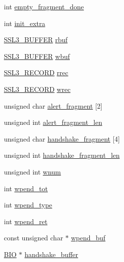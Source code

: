 \begin{DoxyCompactItemize}
\item 
int \hyperlink{structssl3__state__st_a97e5546af9e51f39f4a6c9f7b73ba1b1}{empty\+\_\+fragment\+\_\+done}
\item 
int \hyperlink{structssl3__state__st_ac744a39f9703118ad914799059630a70}{init\+\_\+extra}
\item 
\hyperlink{ssl3_8h_a83f21b8b26819013daff26a110d590a8}{S\+S\+L3\+\_\+\+B\+U\+F\+F\+ER} \hyperlink{structssl3__state__st_afe5098e88b32cad3b79243f2b53f6040}{rbuf}
\item 
\hyperlink{ssl3_8h_a83f21b8b26819013daff26a110d590a8}{S\+S\+L3\+\_\+\+B\+U\+F\+F\+ER} \hyperlink{structssl3__state__st_a96b970880608f297b54db97424330be3}{wbuf}
\item 
\hyperlink{ssl3_8h_a79995c4da12258c4a4a1c028e319f7ea}{S\+S\+L3\+\_\+\+R\+E\+C\+O\+RD} \hyperlink{structssl3__state__st_affde905dbcf7ece7aab929f37ffe043a}{rrec}
\item 
\hyperlink{ssl3_8h_a79995c4da12258c4a4a1c028e319f7ea}{S\+S\+L3\+\_\+\+R\+E\+C\+O\+RD} \hyperlink{structssl3__state__st_ab3e2700e58172be629db1f2af7ef510a}{wrec}
\item 
unsigned char \hyperlink{structssl3__state__st_ac5746677681e98a0ca4e3fb0551dd1df}{alert\+\_\+fragment} \mbox{[}2\mbox{]}
\item 
unsigned int \hyperlink{structssl3__state__st_aa3a633681eec7c0c4a21564e21f3df8b}{alert\+\_\+fragment\+\_\+len}
\item 
unsigned char \hyperlink{structssl3__state__st_af9e35d0aec763a8d5e3b4cf618208343}{handshake\+\_\+fragment} \mbox{[}4\mbox{]}
\item 
unsigned int \hyperlink{structssl3__state__st_aa7f770c0190a7c716ff070e3507751d6}{handshake\+\_\+fragment\+\_\+len}
\item 
unsigned int \hyperlink{structssl3__state__st_a42c9aa8955edc0d1d23e9a82cff856c5}{wnum}
\item 
int \hyperlink{structssl3__state__st_ab5e408a79cde9fbe60437e28f6294dc5}{wpend\+\_\+tot}
\item 
int \hyperlink{structssl3__state__st_a9433855d8d8f5ee9e388e8ab942b6306}{wpend\+\_\+type}
\item 
int \hyperlink{structssl3__state__st_af8b88a29b6ebc467e6754ff6505b7bd0}{wpend\+\_\+ret}
\item 
const unsigned char $\ast$ \hyperlink{structssl3__state__st_a99dc3475625b30f4a59507fd2260ffe3}{wpend\+\_\+buf}
\item 
\hyperlink{bio_8h_af3fabae1c9af50b9312cdff41e11d1dd}{B\+IO} $\ast$ \hyperlink{structssl3__state__st_a576192e2686348c7b7b1c6cf026f2892}{handshake\+\_\+buffer}

\end{DoxyCompactItemize}
